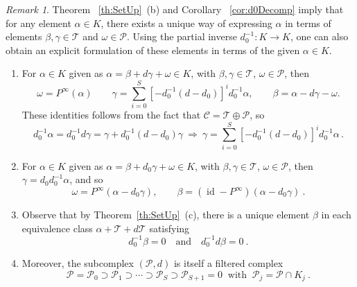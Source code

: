 \documentclass[10pt]{amsart}
\newcounter{dummy} \numberwithin{dummy}{section}
\theoremstyle{remark}
\newtheorem{remark}[dummy]{Remark}
\newcommand{\calP}{\mathcal{P}}
\newcommand{\calT}{\mathcal{T}}
\newcommand{\calC}{\mathcal{C}}
\DeclareMathOperator{\id}{id}
\numberwithin{equation}{section}
\begin{document}
\begin{remark}
Theorem  ~\ref{th:SetUp}~(b) and Corollary ~\ref{cor:d0Decomp} imply that for any element $\alpha\in K$, there exists a unique way of expressing $\alpha$ in terms of elements $\beta,\gamma\in \mathcal{T}$ and $\omega\in\mathcal{P}$.
Using the partial inverse $d_0^{-1}\colon K\to K$, one can also obtain an explicit formulation of these elements in terms of the given $\alpha\in K$.
\begin{enumerate}[\rm (a)]
\item For $\alpha\in K$ given as $\alpha = \beta + d\gamma + \omega \in K$, with $\beta, \gamma\in \calT$, $\omega \in \calP$, then
$$\omega = P^\infty(\alpha) \qquad \gamma = \sum_{i=0}^S [-d_0^{-1}(d-d_0)]^i d^{-1}_0 \alpha, \qquad \beta = \alpha - d \gamma - \omega .$$
These identities follows from the fact that $\calC = \calT \oplus \calP$, so
$$d_0^{-1} \alpha = d_0^{-1} d \gamma = \gamma + d_0^{-1} (d-d_0) \gamma\ \Longrightarrow\ \gamma = \sum_{i=0}^S [- d_0^{-1}(d-d_0)]^i d^{-1}_0 \alpha\,.$$
\item For $\alpha\in K$ given as $\alpha = \beta + d_0\gamma + \omega \in K$, with $\beta, \gamma\in \calT$, $\omega \in \calP$, then $\gamma = d_0 d_0^{-1} \alpha$, and so
$$\omega = P^\infty(\alpha - d_0 \gamma), \qquad \beta = (\id - P^\infty)(\alpha - d_0 \gamma)\ .$$



\item Observe that by Theorem~\ref{th:SetUp}~(c), there is a unique element $\beta$ in each equivalence class $\alpha + \calT + d\calT$ satisfying $$d^{-1}_0\beta =0 \quad \text{and} \quad  d^{-1}_0 d \beta =0\ .$$
\item Moreover, the subcomplex $(\calP,d)$ is itself a filtered complex
$$\calP = \calP_0 \supset \calP_1 \supset  \cdots \supset \calP_S \supset \calP_{S+1} =0\ \text{ with }\ \calP_j = \calP \cap K_j\ .$$
\end{enumerate}
\end{remark}
\end{document}
